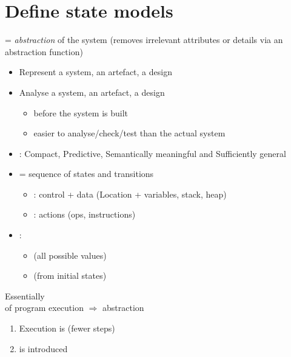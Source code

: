\section{Define state models}

 = \textit{abstraction} of the system (removes irrelevant attributes or details via an abstraction function)
\begin{itemize}
    \item Represent a system, an artefact, a design
    \item Analyse a system, an artefact, a design
    \begin{itemize}
        \item before the system is built
        \item easier to analyse/check/test than the actual system
    \end{itemize}
    \item {} : Compact, Predictive, Semantically meaningful and Sufficiently general
\end{itemize}

\begin{itemize}
    \item {} = sequence of states and transitions
    \begin{itemize}
        \item {} : control + data (Location + variables, stack, heap)
        \item {} : actions (ops, instructions)
    \end{itemize}
    \item {} :
    \begin{itemize}
        \item {} (all possible values)
        \item {} (from initial states)
    \end{itemize}
\end{itemize}

Essentially \\
 of program execution $\Rightarrow$ abstraction
\begin{enumerate}
    \item Execution is  (fewer steps)
    \item {} is introduced
\end{enumerate}

